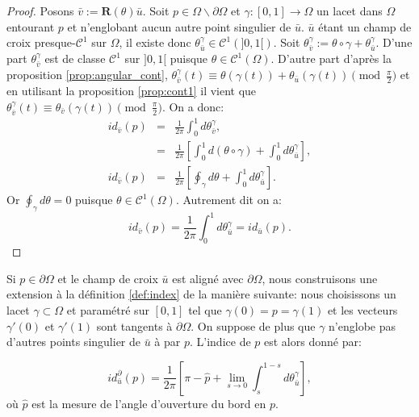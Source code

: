 \begin{proof}
Posons $\bar{v}:=\mathbf{R}(\theta)\bar{u}$. Soit $p\in\Omega\backslash\partial\Omega$ et $\gamma:[0, 1]\longrightarrow\Omega$ un lacet dans $\Omega$ entourant $p$ et n'englobant aucun autre point singulier de $\bar{u}$. $\bar{u}$ étant un champ de croix presque-$\mathcal{C}^1$ sur $\Omega$, il existe donc $\theta_{\bar{u}}^\gamma\in\mathcal{C}^1(]0, 1[)$. Soit $\theta_{\bar{v}}^\gamma:=\theta\circ\gamma+\theta_{\bar{u}}^\gamma$. D'une part $\theta_{\bar{v}}^\gamma$ est de classe $\mathcal{C}^1$ sur $]0, 1[$ puisque $\theta\in\mathcal{C}^1(\Omega)$. D'autre part d'après la proposition \ref{prop:angular_cont}, $\theta_{\bar{v}}^\gamma(t)\equiv\theta(\gamma(t))+\theta_{\bar{u}}(\gamma(t))\pmod{\frac{\pi}{2}}$ et en utilisant la proposition \ref{prop:cont1} il vient que $\theta_{\bar{v}}^\gamma(t)\equiv\theta_{\bar{v}}(\gamma(t))\pmod{\frac{\pi}{2}}$. On a donc:
\begin{eqnarray*}
    id_{\bar{v}}(p)&=&\frac{1}{2\pi}\int_0^1 d\theta_{\bar{v}}^\gamma,\\
    &=&\frac{1}{2\pi}\left[\int_0^1 d(\theta\circ\gamma)+\int_0^1 d\theta_{\bar{u}}^\gamma\right],\\
    id_{\bar{v}}(p)&=&\frac{1}{2\pi}\left[\oint_\gamma d\theta+\int_0^1 d\theta_{\bar{u}}^\gamma\right].
\end{eqnarray*}
Or $\oint_\gamma d\theta=0$ puisque $\theta\in\mathcal{C}^1(\Omega)$. Autrement dit on a:
$$id_{\bar{v}}(p)=\frac{1}{2\pi}\int_0^1 d\theta_{\bar{u}}^\gamma=id_{\bar{u}}(p).$$
\end{proof}

Si $p\in\partial\Omega$ et le champ de croix $\bar{u}$ est aligné avec $\partial\Omega$, nous construisons une extension à la définition \ref{def:index} de la manière suivante: nous choisissons un lacet $\gamma\subset\Omega$ et paramétré sur $[0, 1]$ tel que $\gamma(0)=p=\gamma(1)$ et les vecteurs $\gamma'(0)$ et $\gamma'(1)$ sont tangents à $\partial\Omega$. On suppose de plus que $\gamma$ n'englobe pas d'autres points singulier de $\bar{u}$ à par $p$. L'indice de $p$ est alors donné par:

\begin{equation}
id^\partial_{\bar{u}}(p) = \frac{1}{2\pi}\left[\pi-\hat{p}+\lim\limits_{s\rightarrow 0}\int_s^{1-s}d\theta_{\bar{u}}^\gamma\right],
\label{eqn:Indexboundary}
\end{equation}
où $\hat{p}$ est la mesure de l'angle d'ouverture du bord en $p$. %

